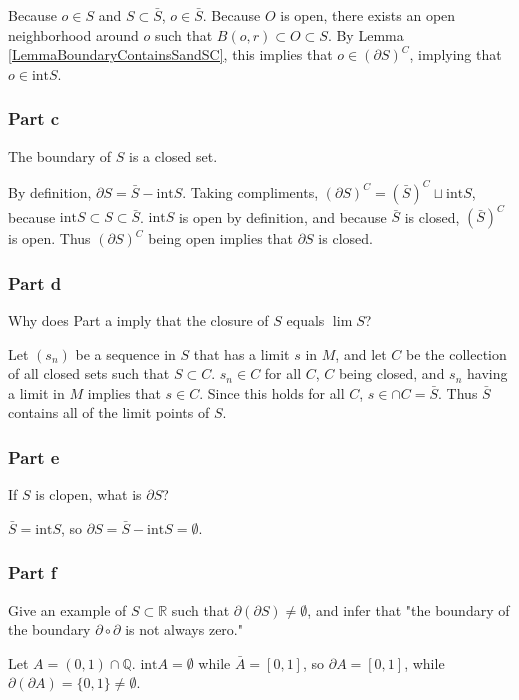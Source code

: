 \documentclass{article}
\newcommand{\Q}{\mathbb{Q}}
\newcommand{\R}{\mathbb{R}}
\newcommand{\inter}{\text{int}}
\begin{document}
Because $o \in S$ and $S \subset \bar{S}$, $o \in \bar{S}$. Because $O$ is open, there exists an open neighborhood around $o$ such that $B(o, r) \subset O \subset S$. By Lemma \ref{LemmaBoundaryContainsSandSC}, this implies that $o \in (\partial S)^C$, implying that $o \in \inter S$.

\subsubsection*{Part c}

The boundary of $S$ is a closed set.

By definition, $\partial S = \bar{S} - \inter S$. Taking compliments, $(\partial S)^C = (\bar{S})^C \sqcup \inter S$, because $\inter S \subset S \subset \bar{S}$. $\inter S$ is open by definition, and because $\bar{S}$ is closed, $(\bar{S})^C$ is open. Thus $(\partial S)^C$ being open implies that $\partial S$ is closed.

\subsubsection*{Part d}

Why does Part a imply that the closure of $S$ equals $\lim S$?

Let $(s_n)$ be a sequence in $S$ that has a limit $s$ in $M$, and let $C$ be the collection of all closed sets such that $S \subset C$. $s_n \in C$ for all $C$, $C$ being closed, and $s_n$ having a limit in $M$ implies that $s \in C$. Since this holds for all $C$, $s \in \cap C = \bar{S}$. Thus $\bar{S}$ contains all of the limit points of $S$.

\subsubsection*{Part e}

If $S$ is clopen, what is $\partial S$?

$\bar{S} = \inter S$, so $\partial S = \bar{S} - \inter S = \emptyset$.

\subsubsection*{Part f}

Give an example of $S \subset \R$ such that $\partial(\partial S) \neq \emptyset$, and infer that "the boundary of the boundary $\partial \circ \partial$ is not always zero."

Let $A = (0, 1) \cap \Q$. $\inter A = \emptyset$ while $\bar{A} = [0, 1]$, so $\partial A = [0, 1]$, while $\partial (\partial A) = \{0, 1\} \neq \emptyset$.
\end{document}
